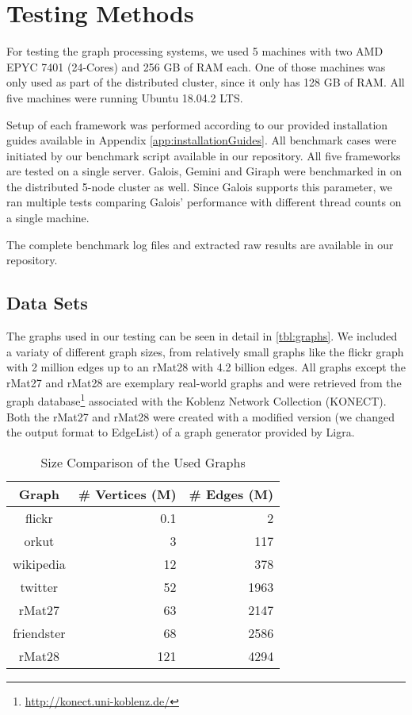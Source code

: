 
\section{Testing Methods}
For testing the graph processing systems, we used 5 machines with two AMD EPYC 7401 (24-Cores) and 256 GB of RAM each. One of those machines was only used as part of the distributed cluster, since it only has 128 GB of RAM.
All five machines were running Ubuntu 18.04.2 LTS.

Setup of each framework was performed according to our provided installation guides available in Appendix \ref{app:installationGuides}.
All benchmark cases were initiated by our benchmark script available in our repository. 
All five frameworks are tested on a single server. 
Galois, Gemini and Giraph were benchmarked in on the distributed 5-node cluster as well.
Since Galois supports this parameter, we ran multiple tests comparing Galois' performance with different thread counts on a single machine.

The complete benchmark log files and extracted raw results are available in our repository.

\subsection{Data Sets}
The graphs used in our testing can be seen in detail in \autoref{tbl:graphs}. We included a variaty of different graph sizes, from relatively small graphs like the flickr graph with 2 million edges up to an rMat28 with 4.2 billion edges. All graphs except the rMat27 and rMat28 are exemplary real-world graphs and were retrieved from the graph database\footnote{\url{http://konect.uni-koblenz.de/}} associated with the Koblenz Network Collection (KONECT)\cite{konect}.
Both the rMat27 and rMat28 were created with a modified version (we changed the output format to EdgeList) of a graph generator provided by Ligra.
\begin{table}
	\centering
	\caption{Size Comparison of the Used Graphs}
	\begin{tabular}{crr}
		\hline
		\bf{Graph}&\# Vertices (M)&\# Edges (M)\\\hline
		flickr&    		0.1&  2\\
		orkut&          3&    117\\
		wikipedia&      12&   378\\
		twitter&     	52&   1963\\
		rMat27&         63&   2147\\
		friendster&     68&   2586\\
		rMat28&         121&  4294\\
		\hline
	\end{tabular}
	\label{tbl:graphs}
\end{table}


